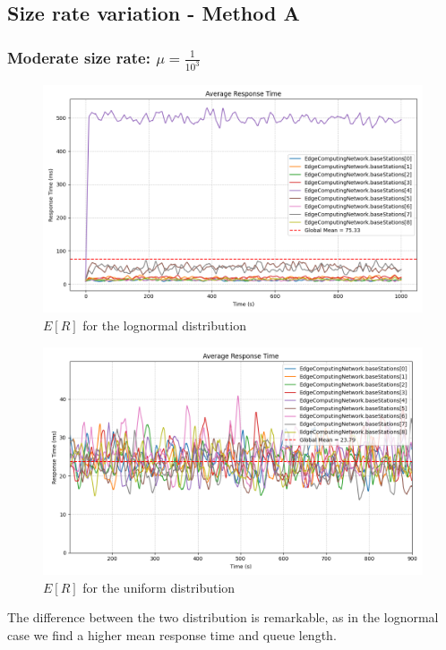 \documentclass{report}
\begin{document}
\subsection{Size rate variation - Method A}
\subsubsection*{Moderate size rate: $\mu=\frac{1}{10^3}$}

\begin{figure}[H]
    \centering
    \includegraphics[width=\textwidth]{img/plots/log_1e3_A/resptime.png}
    \caption{$E[R]$ for the lognormal distribution}
\end{figure}

\begin{figure}[H]
    \centering
    \includegraphics[width=\textwidth]{img/plots/uni_1e3_A/resptime.png}
    \caption{$E[R]$ for the uniform distribution}
\end{figure}

The difference between the two distribution is remarkable, as in the lognormal case we find a higher mean response time and queue length.
\end{document}
